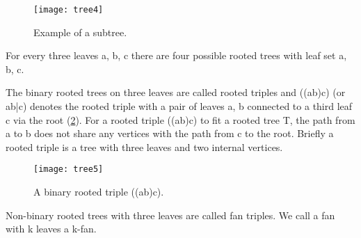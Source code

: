\begin{figure}[!htbp] 
  \center
  \texttt{[image: tree4]}
  \caption[w]{Example of a subtree.} 
  \label{img:sample4}  
\end{figure} 

For every three leaves a, b, c there are four possible rooted trees 
with leaf set a, b, c.  

The binary rooted trees on three leaves are called rooted triples and 
((ab)c) (or ab|c) denotes the rooted triple with a pair of leaves a, b 
connected to a third leaf c via the root (\ref{img:sample5}). For a rooted triple 
((ab)c) to fit a rooted tree T, the path from a to b does not share any 
vertices with the path from c to the root. Briefly a rooted triple is a tree 
with three leaves and two internal vertices. 

\begin{figure}[!htbp] 
  \center
  \texttt{[image: tree5]}
  \caption[w]{ A binary rooted triple ((ab)c).} 
  \label{img:sample5}  
\end{figure} 

Non-binary rooted trees with three leaves are called fan triples. We 
call a fan with k leaves a k-fan. 


